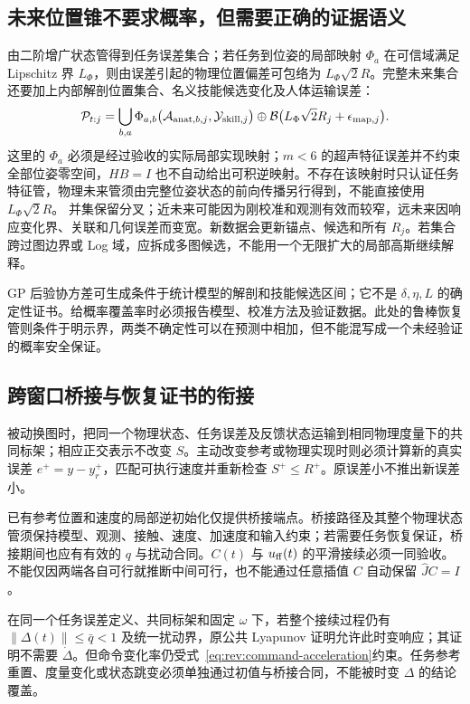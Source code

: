 \documentclass[11pt,a4paper]{article}
\numberwithin{equation}{section}
\theoremstyle{definition}
\begin{document}
\subsection{未来位置锥不要求概率，但需要正确的证据语义}
由二阶增广状态管得到任务误差集合；若任务到位姿的局部映射 $\Phi_a$ 在可信域满足 Lipschitz 界 $L_\Phi$，则由误差引起的物理位置偏差可包络为 $L_\Phi\sqrt2 R$。完整未来集合还要加上内部解剖位置集合、名义技能候选变化及人体运输误差：
\begin{equation}
 \mathcal P_{t:j}=\bigcup_{b,a}\Phi_{a,b}\bigl(\mathcal A_{{\rm anat},b,j},\mathcal Y_{{\rm skill},j}\bigr)
 \oplus\mathcal B\bigl(L_\Phi\sqrt2 R_j+\epsilon_{{\rm map},j}\bigr).
\end{equation}
这里的 $\Phi_a$ 必须是经过验收的实际局部实现映射；$m<6$ 的超声特征误差并不约束全部位姿零空间，$HB=I$ 也不自动给出可积逆映射。不存在该映射时只认证任务特征管，物理未来管须由完整位姿状态的前向传播另行得到，不能直接使用 $L_\Phi\sqrt2 R$。
并集保留分叉；近未来可能因为刚校准和观测有效而较窄，远未来因响应变化界、关联和几何误差而变宽。新数据会更新锚点、候选和所有 $R_j$。若集合跨过图边界或 Log 域，应拆成多图候选，不能用一个无限扩大的局部高斯继续解释。

GP 后验协方差可生成条件于统计模型的解剖和技能候选区间；它不是 $\delta,\eta,L$ 的确定性证书。给概率覆盖率时必须报告模型、校准方法及验证数据。此处的鲁棒恢复管则条件于明示界，两类不确定性可以在预测中相加，但不能混写成一个未经验证的概率安全保证。


\subsection{跨窗口桥接与恢复证书的衔接}
\label{sec:rev:window-bridge}
被动换图时，把同一个物理状态、任务误差及反馈状态运输到相同物理度量下的共同标架；相应正交表示不改变 $S$。主动改变参考或物理实现时则必须计算新的真实误差 $e^+=y-y_r^+$，匹配可执行速度并重新检查 $S^+\le R^+$。原误差小不推出新误差小。

已有参考位置和速度的局部逆初始化仅提供桥接端点。桥接路径及其整个物理状态管须保持模型、观测、接触、速度、加速度和输入约束；若需要任务恢复保证，桥接期间也应有有效的 $q$ 与扰动合同。$C(t)$ 与 $u_{\rm ff}(t)$ 的平滑接续必须一同验收。不能仅因两端各自可行就推断中间可行，也不能通过任意插值 $C$ 自动保留 $\widehat JC=I$。

在同一个任务误差定义、共同标架和固定 $\omega$ 下，若整个接续过程仍有 $\|\Delta(t)\|\le\bar q<1$ 及统一扰动界，原公共 Lyapunov 证明允许此时变响应；其证明不需要 $\dot\Delta$。但命令变化率仍受式~\eqref{eq:rev:command-acceleration}约束。任务参考重置、度量变化或状态跳变必须单独通过初值与桥接合同，不能被时变 $\Delta$ 的结论覆盖。
\end{document}
